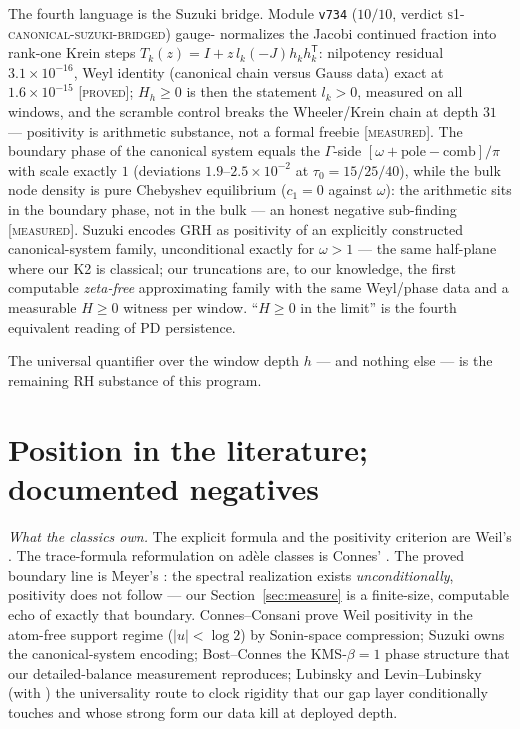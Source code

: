 \documentclass[11pt,a4paper]{article}
\theoremstyle{remark}
\newcommand{\PROVED}{\textnormal{[\textsc{proved}]}}
\newcommand{\MEASURED}{\textnormal{[\textsc{measured}]}}
\begin{document}
The fourth language is the Suzuki bridge.  Module \texttt{v734}
($10/10$, verdict \textsc{s1-canonical-suzuki-bridged}) gauge-
normalizes the Jacobi continued fraction into rank-one Krein steps
$T_k(z)=I+z\,l_k(-J)h_kh_k^{\mathsf T}$: nilpotency residual
$3.1\times10^{-16}$, Weyl identity (canonical chain versus Gauss
data) exact at $1.6\times10^{-15}$ \PROVED; $H_h\ge0$ is then the
statement $l_k>0$, measured on all windows, and the scramble control
breaks the Wheeler/Krein chain at depth $31$ --- positivity is
arithmetic substance, not a formal freebie \MEASURED.  The boundary
phase of the canonical system equals the $\Gamma$-side
$[\omega+\text{pole}-\text{comb}]/\pi$ with scale exactly $1$
(deviations $1.9$--$2.5\times10^{-2}$ at $\tau_0=15/25/40$), while
the bulk node density is pure Chebyshev equilibrium ($c_1=0$ against
$\omega$): the arithmetic sits in the boundary phase, not in the
bulk --- an honest negative sub-finding \MEASURED.  Suzuki
\cite{Suzuki21} encodes GRH as positivity of an explicitly
constructed canonical-system family, unconditional exactly for
$\omega>1$ --- the same half-plane where our K2 is classical; our
truncations are, to our knowledge, the first computable
\emph{zeta-free} approximating family with the same Weyl/phase data
and a measurable $H\ge0$ witness per window.  ``$H\ge0$ in the
limit'' is the fourth equivalent reading of PD persistence.

The universal quantifier over the window depth $h$ --- and nothing
else --- is the remaining RH substance of this program.

\section{Position in the literature; documented
negatives}\label{sec:literature}

\emph{What the classics own.}  The explicit formula and the
positivity criterion are Weil's \cite{Weil52}.  The trace-formula
reformulation on ad\`ele classes is Connes' \cite{Connes99}.  The
proved boundary line is Meyer's \cite{Meyer05}: the spectral
realization exists \emph{unconditionally}, positivity does not
follow --- our Section~\ref{sec:measure} is a finite-size,
computable echo of exactly that boundary.  Connes--Consani
\cite{CC21} prove Weil positivity in the atom-free support regime
($|u|<\log2$) by Sonin-space compression; Suzuki \cite{Suzuki21}
owns the canonical-system encoding; Bost--Connes \cite{BC95} the
KMS-$\beta=1$ phase structure that our detailed-balance measurement
reproduces; Lubinsky and Levin--Lubinsky \cite{Lub09,LL08} (with
\cite{ALS10,Totik09}) the universality route to clock rigidity that
our gap layer conditionally touches and whose strong form our data
kill at deployed depth.
\end{document}
